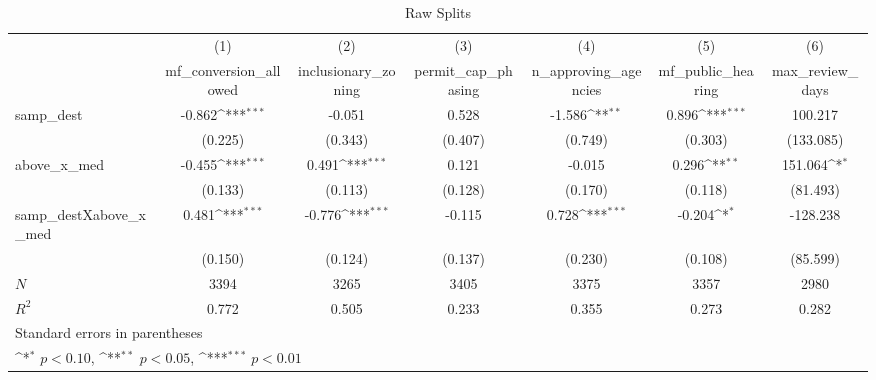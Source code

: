 \begin{table}[htbp]\centering
\def\sym#1{\ifmmode^{#1}\else\(^{#1}\)\fi}
\caption{Raw Splits}
\begin{tabular}{l*{6}{c}}
\hline\hline
            &\multicolumn{1}{c}{(1)}&\multicolumn{1}{c}{(2)}&\multicolumn{1}{c}{(3)}&\multicolumn{1}{c}{(4)}&\multicolumn{1}{c}{(5)}&\multicolumn{1}{c}{(6)}\\
            &\multicolumn{1}{c}{mf\_conversion\_allowed}&\multicolumn{1}{c}{inclusionary\_zoning}&\multicolumn{1}{c}{permit\_cap\_phasing}&\multicolumn{1}{c}{n\_approving\_agencies}&\multicolumn{1}{c}{mf\_public\_hearing}&\multicolumn{1}{c}{max\_review\_days}\\
\hline
samp\_dest   &      -0.862\sym{***}&      -0.051         &       0.528         &      -1.586\sym{**} &       0.896\sym{***}&     100.217         \\
            &     (0.225)         &     (0.343)         &     (0.407)         &     (0.749)         &     (0.303)         &   (133.085)         \\
[1em]
above\_x\_med &      -0.455\sym{***}&       0.491\sym{***}&       0.121         &      -0.015         &       0.296\sym{**} &     151.064\sym{*}  \\
            &     (0.133)         &     (0.113)         &     (0.128)         &     (0.170)         &     (0.118)         &    (81.493)         \\
[1em]
samp\_destXabove\_x\_med&       0.481\sym{***}&      -0.776\sym{***}&      -0.115         &       0.728\sym{***}&      -0.204\sym{*}  &    -128.238         \\
            &     (0.150)         &     (0.124)         &     (0.137)         &     (0.230)         &     (0.108)         &    (85.599)         \\
\hline
\(N\)       &        3394         &        3265         &        3405         &        3375         &        3357         &        2980         \\
\(R^{2}\)   &       0.772         &       0.505         &       0.233         &       0.355         &       0.273         &       0.282         \\
\hline\hline
\multicolumn{7}{l}{\footnotesize Standard errors in parentheses}\\
\multicolumn{7}{l}{\footnotesize \sym{*} \(p<0.10\), \sym{**} \(p<0.05\), \sym{***} \(p<0.01\)}\\
\end{tabular}
\end{table}
